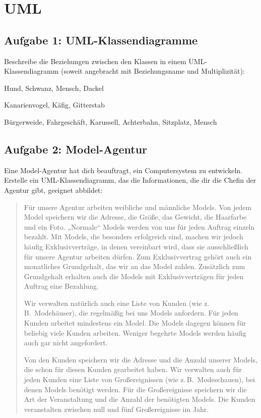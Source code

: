 \section{UML}

\subsection{Aufgabe 1: UML-Klassendiagramme}

Beschreibe die Beziehungen zwischen den Klassen in einem UML-Klassendiagramm
(soweit angebracht mit Beziehungsname und Multiplizität):

\begin{compactenum}[a)]
\item Hund, Schwanz, Mensch, Dackel
\item Kanarienvogel, Käfig, Gitterstab
\item Bürgerweide, Fahrgeschäft, Karussell, Achterbahn, Sitzplatz,
Mensch
\end{compactenum}


\subsection{Aufgabe 2: Model-Agentur}

Eine Model-Agentur hat dich beauftragt, ein Computersystem zu entwickeln.
Erstelle ein UML-Klassendiagramm, das die Informationen, die dir die Chefin der
Agentur gibt, geeignet abbildet:

\begin{quotation}
\noindent Für unsere Agentur arbeiten weibliche und männliche Models. Von jedem
Model speichern wir die Adresse, die Größe, das Gewicht, die Haarfarbe und ein
Foto. „Normale“ Models werden von uns für jeden Auftrag einzeln bezahlt. Mit
Models, die besonders erfolgreich sind, machen wir jedoch häufig
Exklusivverträge, in denen vereinbart wird, dass sie ausschließlich für unsere
Agentur arbeiten dürfen. Zum Exklusivvertrag gehört auch ein monatliches
Grundgehalt, das wir an das Model zahlen. Zusätzlich zum Grundgehalt erhalten
auch die Models mit Exklusivverträgen für jeden Auftrag eine Bezahlung.

Wir verwalten natürlich auch eine Liste von Kunden (wie z.\,B.\ Modehäuser),
die regelmäßig bei uns Models anfordern. Für jeden Kunden arbeitet mindestens
ein Model. Die Models dagegen können für beliebig viele Kunden arbeiten.
Weniger begehrte Models werden häufig auch gar nicht angefordert.

Von den Kunden speichern wir die Adresse und die Anzahl unserer Models, die
schon für diesen Kunden gearbeitet haben. Wir verwalten auch für jeden Kunden
eine Liste von Großereignissen (wie z.\,B.\ Modeschauen), bei denen Models
benötigt werden. Für die Großereignisse speichern wir die Art der
Veranstaltung und die Anzahl der benötigten Models. Die Kunden veranstalten
zwischen null und fünf Großereignisse im Jahr.
\end{quotation}

